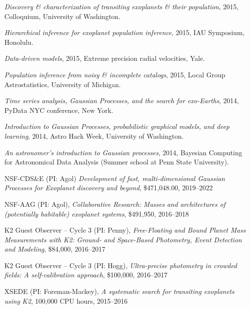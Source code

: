\documentclass[12pt,letterpaper]{article}
\begin{document}
\begin{list}{}{\cvlist}
\item \emph{Discovery \& characterization of transiting exoplanets \& their
    population}, 2015, Colloquium, University of Washington.

\item \emph{Hierarchical inference for exoplanet population inference},
    2015, IAU Symposium, Honolulu.

\item \emph{Data-driven models}, 2015, Extreme precision radial velocities,
    Yale.

\item \emph{Population inference from noisy \& incomplete catalogs}, 2015,
    Local Group Astrostatistics, University of Michigan.

\item \emph{Time series analysis, Gaussian Processes, and the search for
            exo-Earths},
    2014, PyData NYC conference, New York.

\item \emph{Introduction to Gaussian Processes, probabilistic graphical
            models, and deep learning},
    2014, Astro Hack Week, University of Washington.

\item \emph{An astronomer's introduction to Gaussian processes},
    2014, Bayesian Computing for Astronomical Data Analysis (Summer school at
    Penn State University).

\end{list}

\begin{list}{}{\cvlist}

\end{list}

\begin{list}{}{\cvlist}
\item NSF-CDS\&E (PI: Agol)
\emph{Development of fast, multi-dimensional Gaussian Processes for Exoplanet discovery and beyond},
\$471,048.00, 2019--2022

\item
NSF-AAG (PI: Agol),
\emph{Collaborative Research: Masses and architectures of (potentially
    habitable) exoplanet systems},
\$491,950, 2016--2018

\item
K2 Guest Observer -- Cycle 3 (PI: Penny),
\emph{Free-Floating and Bound Planet Mass Measurements with K2: Ground- and
Space-Based Photometry, Event Detection and Modeling},
\$84,000, 2016--2017

\item
K2 Guest Observer -- Cycle 3 (PI: Hogg),
\emph{Ultra-precise photometry in crowded fields: A self-calibration
approach},
\$100,000, 2016--2017

\item
XSEDE (PI: Foreman-Mackey),
\emph{A systematic search for transiting exoplanets using K2},
100,000 CPU hours, 2015--2016
\end{list}
\end{document}
